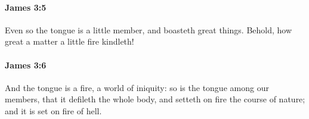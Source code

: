 		\paragraph{James 3:5} %
			\label{JAMES-3-5}

			Even so the tongue is a little member, and boasteth great things. Behold, how great a matter a little fire kindleth!

			\begin{framed}
			\scriptsize
				\begin{compactdesc}
					\item[SBLG] 
				\end{compactdesc}
			\end{framed}

		\paragraph{James 3:6} %
			\label{JAMES-3-6}

			And the tongue is a fire, a world of iniquity: so is the tongue among our members, that it defileth the whole body, and setteth on fire the course of nature; and it is set on fire of hell.

